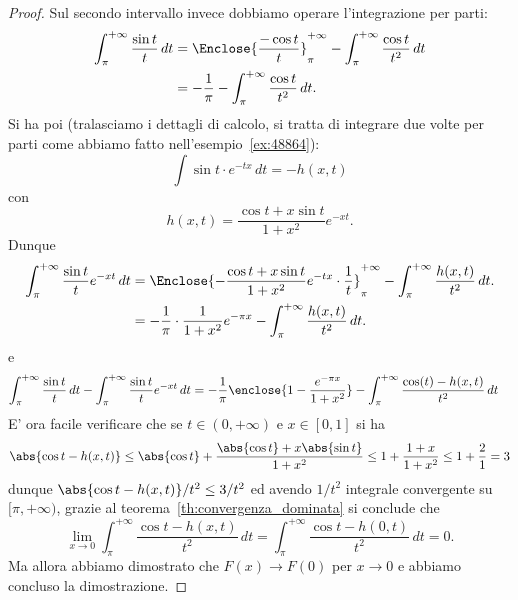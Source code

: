 \begin{proof}
Sul secondo intervallo invece dobbiamo operare l'integrazione per parti:
\begin{align*}
  \int_\pi^{+\infty} \frac{\sin t}{t}\, dt 
  &= \Enclose{\frac{-\cos t}{t}}_{\pi}^{+\infty}
    - \int_{\pi}^{+\infty} \frac{\cos t}{t^2}\, dt \\
  &= -\frac{1}{\pi} - \int_{\pi}^{+\infty} \frac {\cos t}{t^2}\, dt.\\
\end{align*}
Si ha poi (tralasciamo i dettagli di calcolo, 
si tratta di integrare due volte per parti come 
abbiamo fatto nell'esempio~\ref{ex:48864}):
\[
\int \sin t\cdot e^{-tx}\, dt 
= -h(x,t)
\]
con 
\[
h(x,t)= \frac{\cos t+x\sin t}{1+x^2}e^{-xt}.  
\]
Dunque 
\begin{align*}
  \int_\pi^{+\infty} \frac{\sin t}{t} e^{-xt}\, dt 
  &= \Enclose{-\frac{\cos t+ x \sin t}{1+x^2}e^{-tx}\cdot \frac{1}{t}}_{\pi}^{+\infty} 
  - \int_\pi^{+\infty}\frac{h(x,t)}{t^2}\, dt.\\  
  &= -\frac 1 \pi\cdot \frac{1}{1+x^2}e^{-\pi x} - \int_\pi^{+\infty}\frac{h(x,t)}{t^2}\, dt.
\end{align*}
e
\begin{align*}
\int_\pi^{+\infty} \frac{\sin t}{t}\, dt 
-\int_\pi^{+\infty} \frac{\sin t}{t} e^{-xt}\, dt
&= -\frac 1 \pi \enclose{1-\frac{e^{-\pi x}}{1+x^2}}
-\int_\pi^{+\infty} \frac{\cos(t) - h(x,t)}{t^2}\, dt 
\end{align*}
E' ora facile verificare che se $t\in(0,+\infty)$
e $x\in[0,1]$ si ha 
\[
\abs{\cos t - h(x,t)} \le \abs{\cos t} + \frac{\abs{\cos t}+x\abs{\sin t}}{1+x^2}
\le 1+ \frac{1+x}{1+x^2} \le 1 + \frac 2 1 = 3
\]
dunque $\abs{\cos t - h(x,t)}/t^2 \le 3/t^2$ ed avendo $1/t^2$ 
integrale convergente su $[\pi,+\infty)$, grazie 
al teorema~\ref{th:convergenza_dominata} si conclude 
che 
\[
\lim_{x\to 0} \int_\pi^{+\infty} \frac{\cos t - h(x,t)}{t^2}\, dt 
= \int_{\pi}^{+\infty} \frac{\cos t - h(0,t)}{t^2}\, dt 
= 0.  
\]
Ma allora abbiamo dimostrato che $F(x)\to F(0)$ per $x\to 0$ 
e abbiamo concluso la dimostrazione.
\end{proof}

